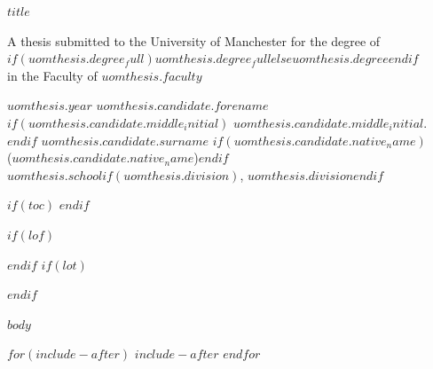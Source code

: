 \documentclass[$if(fontsize)$$fontsize$,$endif$a4paper]{report}
\begin{document}
\begin{titlepage}
\centering
\vspace*{6cm}
{\Large\bfseries $title$\par}
\vspace{3cm}
A thesis submitted to the University of Manchester for the degree of\\
$if(uomthesis.degree_full)$$uomthesis.degree_full$$else$$uomthesis.degree$$endif$\\
in the Faculty of $uomthesis.faculty$
\vspace{3cm}

$uomthesis.year$
\vfill
$uomthesis.candidate.forename$$if(uomthesis.candidate.middle_initial)$ $uomthesis.candidate.middle_initial$.$endif$ $uomthesis.candidate.surname$
$if(uomthesis.candidate.native_name)$\\($uomthesis.candidate.native_name$)$endif$\\[1ex]
$uomthesis.school$$if(uomthesis.division)$, $uomthesis.division$$endif$
\end{titlepage}

$if(toc)$
\setcounter{tocdepth}{$toc-depth$}
\tableofcontents
$endif$

$if(lof)$\listoffigures$endif$
$if(lot)$\listoftables$endif$

$body$

$for(include-after)$
$include-after$
$endfor$
\end{document}
